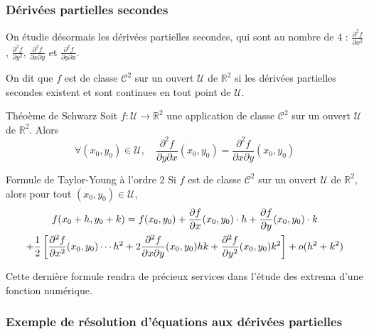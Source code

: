     \subsubsection{Dérivées partielles secondes}

    On étudie désormais les dérivées partielles secondes, qui sont au nombre de 4 : $\frac{\partial^2 f}{\partial x^2}$, $\frac{\partial^2 f}{\partial y^2}$, $\frac{\partial^2 f}{\partial x \partial y}$ et $\frac{\partial^2 f}{\partial y \partial x}$.

    \begin{defi}{}{}
        On dit que $f$ est de classe $\mathcal{C}^2$ sur un ouvert $\mathcal{U}$ de $\mathbb{R}^2$ si les dérivées partielles secondes existent et sont continues en tout point de $\mathcal{U}$. 
    \end{defi}

    \begin{theo}{Théoème de Schwarz}{}
        Soit $f : \mathcal{U} \to \mathbb{R}^2$ une application de classe $\mathcal{C}^2$ sur un ouvert $\mathcal{U}$ de $\mathbb{R}^2$. Alors 
        \[ \forall (x_0,y_0) \in \mathcal{U}, \quad \frac{\partial^2 f}{\partial y \partial x}(x_0,y_0) = \frac{\partial^2 f}{\partial x \partial y}(x_0,y_0) \]   
    \end{theo}

    \begin{theo}{Formule de Taylor-Young à l’ordre 2}{}
        Si $f$ est de classe $\mathcal{C}^2$ sur un ouvert $\mathcal{U}$ de $\mathbb{R}^2$, alors pour tout $(x_0,y_0) \in \mathcal{U}$, 
        \begin{multline*}
            f(x_0 + h, y_0 + k) = f(x_0, y_0) + \frac{\partial f}{\partial x}(x_0,y_0) \cdot h + \frac{\partial f}{\partial y}(x_0,y_0) \cdot k \\
            + \frac{1}{2} \left[\frac{\partial^2 f}{\partial x^2}(x_0,y_0) \cdots h^2 + 2 \frac{\partial^2 f}{\partial x \partial y}(x_0,y_0) h k + \frac{\partial^2 f}{\partial y^2}(x_0,y_0) k^2 \right] + o(h^2 + k^2)
        \end{multline*}
    \end{theo}

    Cette dernière formule rendra de précieux services dans l’étude des extrema d’une fonction numérique.

    \subsubsection{Exemple de résolution d’équations aux dérivées partielles} 

